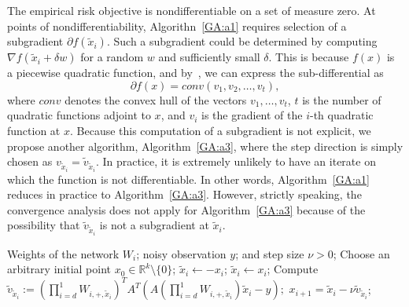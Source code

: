 The empirical risk objective is nondifferentiable on a set of measure zero.  At points of nondifferentiability, Algorithn~\ref{GA:a1} requires selection of a subgradient $\partial f(\tilde{x}_i)$.  Such a subgradient could be determined by computing $\nabla f(\tilde{x}_i + \delta w)$ for a random $w$ and sufficiently small $\delta$.  This is because $f(x)$ is a piecewise quadratic function,  and by~\cite[Theorem~9.6]{Clason2017}, we can express the sub-differential as
\begin{equation} \label{GA:e56}
\partial f(x) = conv(v_1, v_2, \ldots, v_t),
\end{equation}
where $conv$ denotes the convex hull of the vectors $v_1, \ldots, v_t$, $t$ is the number of quadratic functions adjoint to $x$, and $v_i$ is the gradient of the $i$-th quadratic function at $x$.  Because this computation of a subgradient is not explicit, we propose another algorithm, Algorithm~\ref{GA:a3}, where the step direction is simply chosen as ${v}_{\tilde{x}_i} = \tilde{v}_{\tilde{x}_i}$. In practice, it is extremely unlikely to have an iterate on which the function is not differentiable. %
In other words, Algorithm~\ref{GA:a1} reduces in practice to Algorithm~\ref{GA:a3}. However, strictly speaking, the convergence analysis does not apply for Algorithm~\ref{GA:a3} because of the possibility that $ \tilde{v}_{\tilde{x}_i}$ is not a subgradient at $\tilde{x}_i$.
\begin{algorithm}
\caption{Practical gradient descent method}
\label{GA:a3}
\begin{algorithmic}[1]
\REQUIRE Weights of the network $W_i$; noisy observation $y$; and step size $\nu > 0$;
\STATE Choose an arbitrary initial point $x_0 \in \mathbb{R}^k \setminus \{0\}$;
\STATE $\tilde{x}_{i} \gets - x_{i}$; %
\ELSE
\STATE $\tilde{x}_i \gets x_i$;
\ENDIF 
\STATE   Compute
$
\tilde{v}_{\tilde{x}_i} := \left(\prod_{i = d}^1 W_{i, +, \tilde{x}_i}\right)^T A^T( A \left(\prod_{i = d}^1 W_{i, +, \tilde{x}_i}\right) \tilde{x}_i - y);
$
\STATE $x_{i+1} = \tilde{x}_i - \nu {\tilde v}_{\tilde{x}_i}$;
\ENDFOR
\end{algorithmic}
\end{algorithm}

